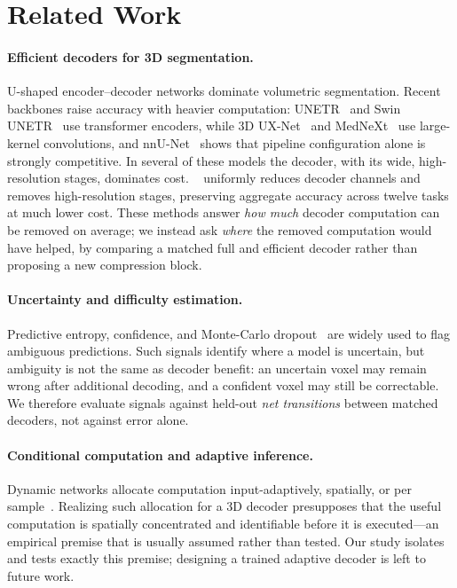 \section{Related Work}
\label{sec:related}

\paragraph{Efficient decoders for 3D segmentation.}
U-shaped encoder--decoder networks dominate volumetric segmentation.  Recent
backbones raise accuracy with heavier computation: UNETR~\cite{hatamizadeh2022unetr}
and Swin UNETR~\cite{tang2022swinunetr,he2023swinunetrv2} use transformer
encoders, while 3D UX-Net~\cite{lee20233duxnet} and
MedNeXt~\cite{roy2023mednext} use large-kernel convolutions, and
nnU-Net~\cite{isensee2021nnunet} shows that pipeline configuration alone is
strongly competitive.  In several of these models the decoder, with its wide,
high-resolution stages, dominates cost.  \method{}~\cite{rahman2025effidec3d}
uniformly reduces decoder channels and removes high-resolution stages, preserving
aggregate accuracy across twelve tasks at much lower cost.  These methods answer
\emph{how much} decoder computation can be removed on average; we instead ask
\emph{where} the removed computation would have helped, by comparing a matched
full and efficient decoder rather than proposing a new compression block.

\paragraph{Uncertainty and difficulty estimation.}
Predictive entropy, confidence, and Monte-Carlo dropout~\cite{gal2016dropout} are
widely used to flag ambiguous predictions.  Such signals identify where a model
is uncertain, but ambiguity is not the same as decoder benefit: an uncertain
voxel may remain wrong after additional decoding, and a confident voxel may still
be correctable.  We therefore evaluate signals against held-out \emph{net
transitions} between matched decoders, not against error alone.

\paragraph{Conditional computation and adaptive inference.}
Dynamic networks allocate computation input-adaptively, spatially, or per
sample~\cite{han2021dynamic}.  Realizing such allocation for a 3D decoder
presupposes that the useful computation is spatially concentrated and
identifiable before it is executed---an empirical premise that is usually assumed
rather than tested.  Our study isolates and tests exactly this premise; designing
a trained adaptive decoder is left to future work.

